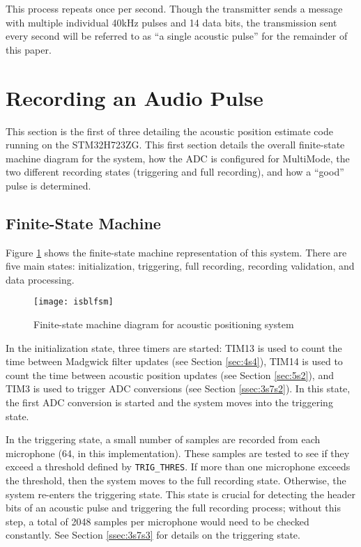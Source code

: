 \documentclass[12pt,a4paper]{report}
\begin{document}
This process repeats once per second. Though the transmitter sends a message with multiple individual 40kHz pulses and 14 data bits, the transmission sent every second will be referred to as “a single acoustic pulse” for the remainder of this paper.

\section{Recording an Audio Pulse} \label{sec:3s7}
This section is the first of three detailing the acoustic position estimate code running on the STM32H723ZG. This first section details the overall finite-state machine diagram for the system, how the ADC is configured for MultiMode, the two different recording states (triggering and full recording), and how a “good” pulse is determined.

\subsection{Finite-State Machine} \label{ssec:3s7s1}
Figure \ref{fig:isblfsm} shows the finite-state machine representation of this system. There are five main states: initialization, triggering, full recording, recording validation, and data processing.

\begin{figure}[htbp]
	\centering
	\texttt{[image: isblfsm]}
	\caption{Finite-state machine diagram for acoustic positioning system}
	\label{fig:isblfsm}
\end{figure}

In the initialization state, three timers are started: TIM13 is used to count the time between Madgwick filter updates (see Section \ref{sec:4s4}), TIM14 is used to count the time between acoustic position updates (see Section \ref{sec:5s2}), and TIM3 is used to trigger ADC conversions (see Section \ref{ssec:3s7s2}). In this state, the first ADC conversion is started and the system moves into the triggering state.

In the triggering state, a small number of samples are recorded from each microphone (64, in this implementation). These samples are tested to see if they exceed a threshold defined by \verb|TRIG_THRES|. If more than one microphone exceeds the threshold, then the system moves to the full recording state. Otherwise, the system re-enters the triggering state. This state is crucial for detecting the header bits of an acoustic pulse and triggering the full recording process; without this step, a total of 2048 samples per microphone would need to be checked constantly. See Section \ref{ssec:3s7s3} for details on the triggering state.
\end{document}
